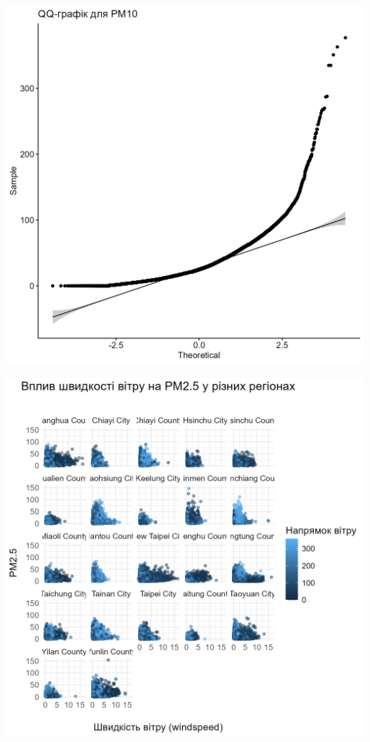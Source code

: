\documentclass[./report.tex]{subfiles}
\begin{document}
\begin{enumerate}
  \includegraphics[width=6in]{plots/question1/qq_pm10.png}

  \includegraphics[width = 6in]{plots/question1/scatter_pm2_5_region.png}


\end{enumerate}
\end{document}
